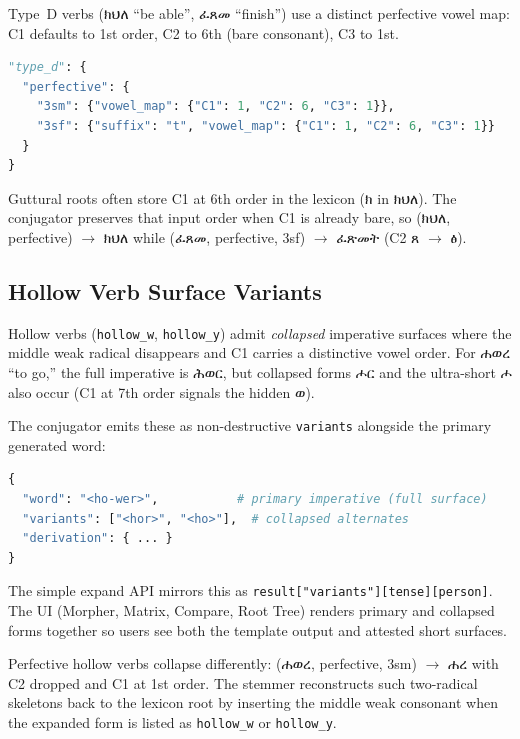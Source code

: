 \documentclass[conference]{IEEEtran}
\newcommand{\geez}[1]{{\ethiopicfont #1}}
\begin{document}
Type~D verbs (\geez{ክህለ} ``be able'', \geez{ፈጸመ} ``finish'') use a distinct perfective vowel map: C1 defaults to 1st order, C2 to 6th (bare consonant), C3 to 1st.

\begin{lstlisting}[language=Python]
"type_d": {
  "perfective": {
    "3sm": {"vowel_map": {"C1": 1, "C2": 6, "C3": 1}},
    "3sf": {"suffix": "t", "vowel_map": {"C1": 1, "C2": 6, "C3": 1}}
  }
}
\end{lstlisting}

Guttural roots often store C1 at 6th order in the lexicon (\geez{ክ} in \geez{ክህለ}). The conjugator preserves that input order when C1 is already bare, so (\geez{ክህለ}, perfective) $\rightarrow$ \geez{ክህለ} while (\geez{ፈጸመ}, perfective, 3sf) $\rightarrow$ \geez{ፈጽመት} (C2 \geez{ጸ} $\rightarrow$ \geez{ፅ}).

\subsection{Hollow Verb Surface Variants}

Hollow verbs (\texttt{hollow\_w}, \texttt{hollow\_y}) admit \emph{collapsed} imperative surfaces where the middle weak radical disappears and C1 carries a distinctive vowel order. For \geez{ሐወረ} ``to go,'' the full imperative is \geez{ሕወር}, but collapsed forms \geez{ሖር} and the ultra-short \geez{ሖ} also occur (C1 at 7th order signals the hidden \geez{ወ}).

The conjugator emits these as non-destructive \texttt{variants} alongside the primary generated word:
\begin{lstlisting}[language=Python]
{
  "word": "<ho-wer>",           # primary imperative (full surface)
  "variants": ["<hor>", "<ho>"],  # collapsed alternates
  "derivation": { ... }
}
\end{lstlisting}

\noindent The simple expand API mirrors this as \texttt{result["variants"][tense][person]}. The UI (Morpher, Matrix, Compare, Root Tree) renders primary and collapsed forms together so users see both the template output and attested short surfaces.

Perfective hollow verbs collapse differently: (\geez{ሐወረ}, perfective, 3sm) $\rightarrow$ \geez{ሐረ} with C2 dropped and C1 at 1st order. The stemmer reconstructs such two-radical skeletons back to the lexicon root by inserting the middle weak consonant when the expanded form is listed as \texttt{hollow\_w} or \texttt{hollow\_y}.
\end{document}
